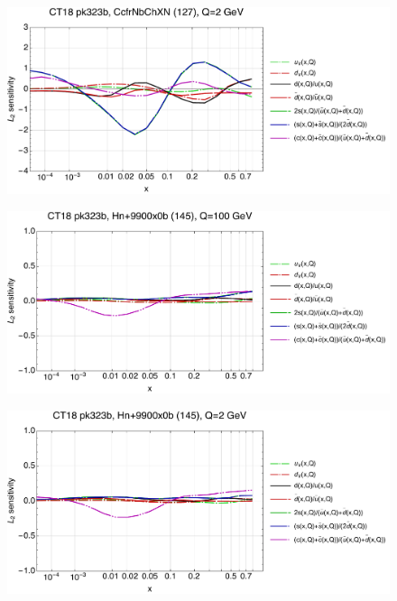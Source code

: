 \documentclass[10pt,aps,prd,floatfix,titlepage]{revtex4}
\begin{document}
\begin{figure}
\includegraphics[width=\textwidth,height=0.44\textheight,keepaspectratio]{2/127_ct18nn_q2_Sf_2.pdf}
\caption{}
\end{figure}
\clearpage
\begin{figure}
\includegraphics[width=\textwidth,height=0.44\textheight,keepaspectratio]{2/145_ct18nn_q100_Sf_2.pdf}
\caption{}
\end{figure}
\begin{figure}
\includegraphics[width=\textwidth,height=0.44\textheight,keepaspectratio]{2/145_ct18nn_q2_Sf_2.pdf}
\caption{}
\end{figure}
\end{document}
